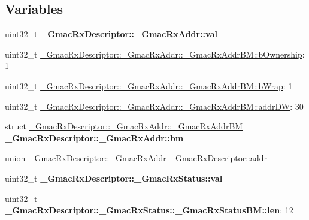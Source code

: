 \subsection*{Variables}
\begin{DoxyCompactItemize}
\item 
\mbox{\label{group__gmac__defines_ga9b332e932ec03a04c86078ebab3193b4}} 
uint32\+\_\+t {\bfseries \+\_\+\+Gmac\+Rx\+Descriptor\+::\+\_\+\+Gmac\+Rx\+Addr\+::val}
\item 
uint32\+\_\+t \mbox{\hyperlink{group__gmac__defines_gabe36538aa63ed4d083eb80dcaf9288e5}{\+\_\+\+Gmac\+Rx\+Descriptor\+::\+\_\+\+Gmac\+Rx\+Addr\+::\+\_\+\+Gmac\+Rx\+Addr\+B\+M\+::b\+Ownership}}\+: 1
\item 
uint32\+\_\+t \mbox{\hyperlink{group__gmac__defines_gae5d7e7953d3959acddd6b70f99b4ddc9}{\+\_\+\+Gmac\+Rx\+Descriptor\+::\+\_\+\+Gmac\+Rx\+Addr\+::\+\_\+\+Gmac\+Rx\+Addr\+B\+M\+::b\+Wrap}}\+: 1
\item 
uint32\+\_\+t \mbox{\hyperlink{group__gmac__defines_ga6debab2368d4f0df7f6493cc059576f5}{\+\_\+\+Gmac\+Rx\+Descriptor\+::\+\_\+\+Gmac\+Rx\+Addr\+::\+\_\+\+Gmac\+Rx\+Addr\+B\+M\+::addr\+DW}}\+: 30
\item 
\mbox{\label{group__gmac__defines_ga2639e5f789fbcc35442b7d0c1ab221cd}} 
struct \mbox{\hyperlink{struct__GmacRxDescriptor_1_1__GmacRxAddr_1_1__GmacRxAddrBM}{\+\_\+\+Gmac\+Rx\+Descriptor\+::\+\_\+\+Gmac\+Rx\+Addr\+::\+\_\+\+Gmac\+Rx\+Addr\+BM}} {\bfseries \+\_\+\+Gmac\+Rx\+Descriptor\+::\+\_\+\+Gmac\+Rx\+Addr\+::bm}
\item 
union \mbox{\hyperlink{union__GmacRxDescriptor_1_1__GmacRxAddr}{\+\_\+\+Gmac\+Rx\+Descriptor\+::\+\_\+\+Gmac\+Rx\+Addr}} \mbox{\hyperlink{group__gmac__defines_ga9bc3c47006fd42d92c6fdef66a1b4762}{\+\_\+\+Gmac\+Rx\+Descriptor\+::addr}}
\item 
\mbox{\label{group__gmac__defines_ga5add3e4cf4c619474745e1c29ad48721}} 
uint32\+\_\+t {\bfseries \+\_\+\+Gmac\+Rx\+Descriptor\+::\+\_\+\+Gmac\+Rx\+Status\+::val}
\item 
\mbox{\label{group__gmac__defines_ga72dd6771ac8242c99a75d7f2c7c8ed2a}} 
uint32\+\_\+t {\bfseries \+\_\+\+Gmac\+Rx\+Descriptor\+::\+\_\+\+Gmac\+Rx\+Status\+::\+\_\+\+Gmac\+Rx\+Status\+B\+M\+::len}\+: 12
\item 

\end{DoxyCompactItemize}
